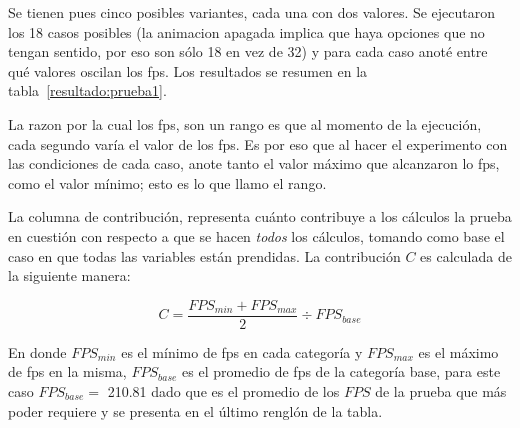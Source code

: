Se tienen pues cinco posibles variantes, cada una con dos valores.
Se ejecutaron los 18 casos posibles (la animacion apagada implica que haya opciones que no tengan sentido, por eso son sólo 18 en vez de 32) y para cada caso anoté entre qué valores oscilan los fps. Los resultados se resumen en la tabla~\ref{resultado:prueba1}.

La razon por la cual los fps, son un rango es que al momento de la ejecución, cada segundo varía el valor de los fps.
Es por eso que al hacer el experimento con las condiciones de cada caso, anote tanto el valor máximo que alcanzaron lo fps, como el valor mínimo; esto es lo que llamo el rango.

La columna de contribución, representa cuánto contribuye a los cálculos la prueba en cuestión con respecto a que se hacen \emph{todos} los cálculos, tomando como base el caso en que todas las variables están prendidas.
La contribución $C$ es calculada de la siguiente manera:

$$ C = \frac{FPS_{min} + FPS_{max}}{2} \div FPS_{base}$$

En donde $FPS_{min}$ es el mínimo de fps en cada categoría y $FPS_{max}$ es el máximo de fps en la misma, $FPS_{base}$ es el promedio de fps de la categoría base, para este caso $FPS_{base} =$ 210.81 dado que es el promedio de los $FPS$ de la prueba que más poder requiere y se presenta en el último renglón de la tabla.


